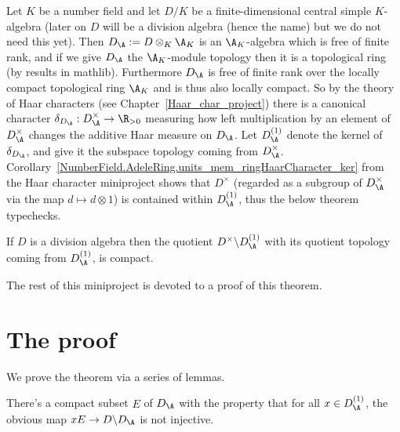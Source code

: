 Let $K$ be a number field and let $D/K$ be a finite-dimensional central simple $K$-algebra
(later on $D$ will be a division algebra (hence the name) but we do not need this yet).
Then $D_{\A}:=D\otimes_K\A_K$ is an $\A_K$-algebra which
is free of finite rank, and if we give $D_{\A}$ the $\A_K$-module topology then it is
a topological ring (by results in mathlib). Furthermore $D_{\A}$ is free of finite
rank over the locally compact topological ring $\A_K$ and is thus also
locally compact. So by the theory of Haar characters (see Chapter~\ref{Haar_char_project})
there is a canonical character $\delta_{D_{\A}}:D_{\A}^\times\to\R_{>0}$ measuring
how left multiplication by an element of $D_{\A}^\times$ changes the additive Haar
measure on $D_{\A}$. Let $D_{\A}^{(1)}$ denote the kernel of $\delta_{D_{\A}}$,
and give it the subspace topology coming from $D_{\A}^\times$.
Corollary~\ref{NumberField.AdeleRing.units_mem_ringHaarCharacter_ker} from the
Haar character miniproject shows that $D^\times$ (regarded as a subgroup of $D_{\A}^\times$
via the map $d\mapsto d\otimes 1$) is contained within $D_{\A}^{(1)}$,
thus the below theorem typechecks.

\begin{theorem}
  \label{NumberField.AdeleRing.DivisionAlgebra.compact_quotient}
  \leanok
  If $D$ is a division algebra then
  the quotient $D^\times\backslash D_{\A}^{(1)}$
  with its quotient topology coming from $D_{\A}^{(1)}$, is compact.
\end{theorem}

The rest of this miniproject is devoted to a proof of this theorem.

\section{The proof}

We prove the theorem via a series of lemmas.

\begin{lemma}
  \label{NumberField.AdeleRing.DivisionAlgebra.Aux.existsE}
  \leanok
  There's a compact subset $E$ of $D_{\A}$
  with the property that for all $x\in D_{\A}^{(1)}$,
  the obvious map $xE\to D\backslash D_{\A}$ is not injective.
\end{lemma}

